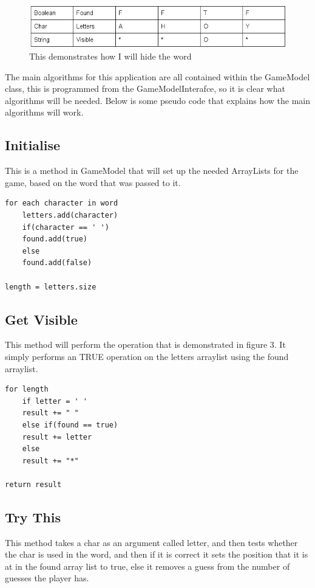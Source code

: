 \documentclass[notitlepage]{report}
\begin{document}
\begin{figure}[!htb]
  \centering
  \includegraphics[scale=0.5]{table}
  \caption{This demonstrates how I will hide the word}
  \label{fig:label}
\end{figure}

The main algorithms for this application are all contained within the GameModel class, this is programmed from the GameModelInterafce, so it is clear what algorithms will be needed. Below is some pseudo code that explains how the main algorithms will work.

\subsection{Initialise}
This is a method in GameModel that will set up the needed ArrayLists for the game, based on the word that was passed to it. 

\begin{lstlisting}
for each character in word 
    letters.add(character)
    if(character == ' ')
	found.add(true)
    else
	found.add(false)

length = letters.size
\end{lstlisting}

\subsection{Get Visible}
This method will perform the operation that is demonstrated in figure 3. It simply performs an TRUE operation on the letters arraylist using the found arraylist. 

\begin{lstlisting}
for length
    if letter = ' '
	result += " "
    else if(found == true)
	result += letter
    else
	result += "*"

return result
\end{lstlisting}
 

\subsection{Try This}
This method takes a char as an argument called letter, and then tests whether the char is used in the word, and then if it is correct it sets the position that it is at in the found array list to true, else it removes a guess from the number of guesses the player has. 
\end{document}
